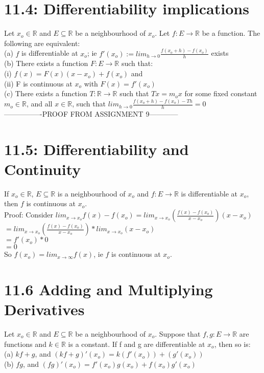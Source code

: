 \documentclass[10pt,letter]{report}
\begin{document}
\section*{11.4: Differentiability implications}
Let $x_o\in\mathbb{R}$ and $E\subseteq\mathbb{R}$ be a neighbourhood of $x_o$. Let $f:E\rightarrow\mathbb{R}$ be a function. The following are equivalent: \\ 
(a) $f$ is differentiable at $x_o$; ie $f'(x_o):=lim_{h\rightarrow0}\frac{f(x_o+h)-f(x_o)}{h}$ exists \\ 
(b) There exists a function $F:E\rightarrow\mathbb{R}$ such that: \\
\hspace*{5mm} (i) $f(x)=F(x)(x-x_o)+f(x_o)$ and \\
\hspace*{5mm} (ii) F is continuous at $x_o$ with $F(x)=f'(x_o)$ \\ 
(c) There exists a function $T:\mathbb{R}\rightarrow\mathbb{R}$ such that $Tx=m_ox$ for some fixed constant $m_o\in\mathbb{R}$, and all $x\in\mathbb{R}$, such that $lim_{h\rightarrow0}\frac{f(x_o+h)-f(x_o)-Th}{h} = 0$\\ 

----------------PROOF FROM ASSIGNMENT 9------------

\section*{11.5: Differentiability and Continuity}
If $x_o\in\mathbb{R}$, $E\subseteq\mathbb{R}$ is a neighbourhood of $x_o$ and $f:E\rightarrow\mathbb{R}$ is differentiable at $x_o$, then $f$ is continuous at $x_o$. \\ 
Proof: Consider $lim_{x\rightarrow x_o}f(x)-f(x_o) = lim_{x\rightarrow x_o}(\frac{f(x)-f(x_o)}{x-x_o})(x-x_o)$\\ 
$= lim_{x\rightarrow x_o}(\frac{f(x)-f(x_o)}{x-x_o})*lim_{x\rightarrow x_o}(x-x_o)$ \\ 
$= f'(x_o)* 0$\\ 
$= 0$\\ 
So $f(x_o)=lim_{x\rightarrow\infty}f(x)$, ie $f$ is continuous at $x_o$. 

\section*{11.6 Adding and Multiplying Derivatives}
Let $x_o\in\mathbb{R}$ and $E\subseteq\mathbb{R}$ be a neighbourhood of $x_o$. Suppose that $f,g:E\rightarrow\mathbb{R}$ are functions and $k\in\mathbb{R}$ is a constant. If f and g are differentiable at $x_o$, then so is:\\ 
(a) $kf+g$, and $(kf+g)'(x_o)=k(f'(x_o))+(g'(x_o))$\\ 
(b) $fg$, and $(fg)'(x_o) = f'(x_o)g(x_o)+f(x_o)g'(x_o)$\\ 
\end{document}
